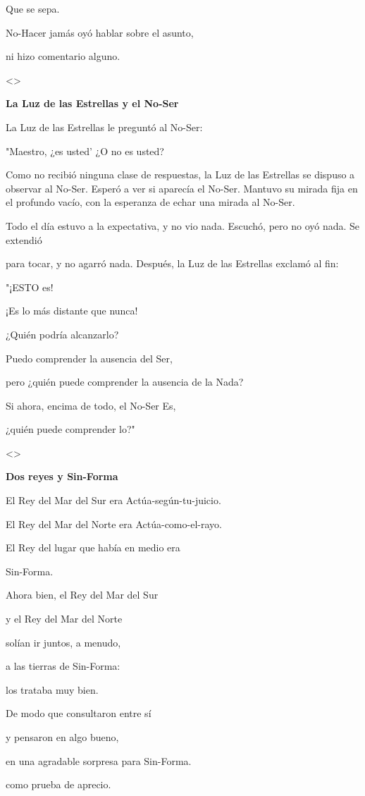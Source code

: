 Que se sepa.

No-Hacer jamás oyó hablar sobre el asunto,

ni hizo comentario alguno.

\textless\textgreater{}

\textbf{{La Luz de las Estrellas y el No-Ser}}

La Luz de las Estrellas le preguntó al No-Ser:

"Maestro, ¿es usted' ¿O no es usted?

Como no recibió ninguna clase de respuestas, la Luz de las Estrellas se
dispuso a observar al No-Ser. Esperó a ver si aparecía el No-Ser.
Mantuvo su mirada fija en el profundo vacío, con la esperanza de echar
una mirada al No-Ser.

Todo el día estuvo a la expectativa, y no vio nada. Escuchó, pero no oyó
nada. Se extendió

para tocar, y no agarró nada. Después, la Luz de las Estrellas exclamó
al fin:

"¡ESTO es!

¡Es lo más distante que nunca!

¿Quién podría alcanzarlo?

Puedo comprender la ausencia del Ser,

pero ¿quién puede comprender la ausencia de la Nada?

Si ahora, encima de todo, el No-Ser Es,

¿quién puede comprender lo?"

\textless\textgreater{}

\textbf{{Dos reyes y Sin-Forma}}

El Rey del Mar del Sur era Actúa-según-tu-juicio.

El Rey del Mar del Norte era Actúa-como-el-rayo.

El Rey del lugar que había en medio era

Sin-Forma.

Ahora bien, el Rey del Mar del Sur

y el Rey del Mar del Norte

solían ir juntos, a menudo,

a las tierras de Sin-Forma:

los trataba muy bien.

De modo que consultaron entre sí

y pensaron en algo bueno,

en una agradable sorpresa para Sin-Forma.

como prueba de aprecio.

